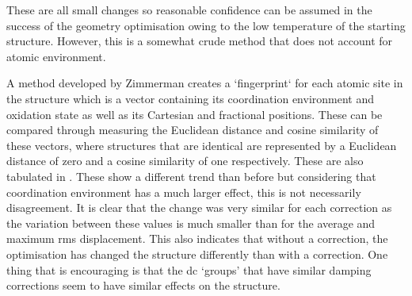These are all small changes so reasonable confidence can be assumed in the success of the geometry optimisation owing to the low temperature of the starting structure. However, this is a somewhat crude method that does not account for atomic environment. 

A method developed by Zimmerman \DIFdelbegin \DIFdel{~}\DIFdelend \cite{Ward2018} creates a `fingerprint` for each atomic site in the structure which is a vector containing its coordination environment and oxidation state as well as its Cartesian and fractional positions. These can be compared through measuring the Euclidean distance and cosine similarity of these vectors, where structures that are identical are represented by a Euclidean distance of zero and a cosine similarity of one respectively. These are also tabulated in . These show a different trend than before but considering that coordination environment has a much larger effect, this is not necessarily disagreement. It is clear that the change was very similar for each correction as the variation between these values is much smaller than for the average and maximum \acrshort{rms} displacement. This also indicates that without a correction, the optimisation has changed the structure differently than with a correction. One thing that is encouraging is that the \acrshort{dc} ‘groups’ that have similar damping corrections seem to have similar effects on the structure. 


